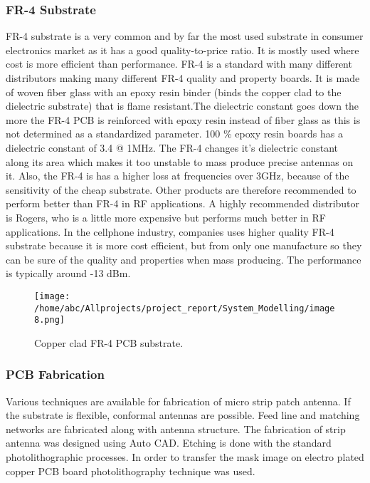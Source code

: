 	             \subsubsection{FR-4 Substrate}
		           \justify
		            FR-4 substrate is a very common and by far the most used substrate in consumer electronics market as it has a good quality-to-price ratio. It is mostly used where cost is more efficient than performance. FR-4 is a standard with many different distributors making many different FR-4 quality and property boards. It is made of woven fiber glass with an epoxy resin binder (binds the copper clad to the dielectric substrate) that is flame resistant.The dielectric constant goes down the more the FR-4 PCB is reinforced with epoxy resin instead of fiber glass as this is not determined as a standardized parameter. 100 \% epoxy resin boards has a dielectric constant of 3.4 @ 1MHz.
		           \justify
		           	The FR-4 changes it’s dielectric constant along its area which makes it too unstable to mass produce precise antennas on it. Also, the FR-4 is has a higher loss at frequencies over 3GHz, because of the sensitivity of the cheap substrate. Other products are therefore recommended to perform better than FR-4 in RF applications. A highly recommended distributor is Rogers, who is a little more expensive but performs much better in RF applications. In the cellphone industry, companies uses higher quality FR-4 substrate because it is more cost efficient, but from only one manufacture so they can be sure of the quality and properties when mass producing. The performance is typically around -13 dBm.\\

		            \begin{figure}[H]
		            	\centering
		            	\texttt{[image: /home/abc/Allprojects/project\_report/System\_Modelling/image8.png]}
		            	\caption{Copper clad FR-4 PCB substrate.}
		            \end{figure}


\subsubsection{PCB Fabrication}
\justify
Various techniques are available for fabrication of micro strip patch antenna. If the substrate is flexible, conformal antennas are possible. Feed line and matching networks are fabricated along with antenna structure. The fabrication of strip antenna was designed using Auto CAD. Etching is done with the standard photolithographic processes. In order to transfer the mask image on electro plated copper PCB board photolithography technique was used. 

